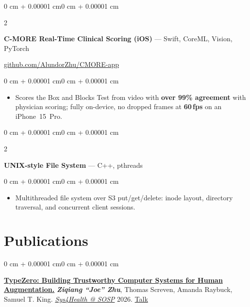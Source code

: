 \documentclass[10pt, letterpaper]{article}
\newenvironment{highlights}{
    \begin{itemize}[
        topsep=0.06 cm,
        parsep=0.04 cm,
        partopsep=0pt,
        itemsep=0pt,
        leftmargin=0 cm + 10pt
    ]
}{
    \end{itemize}
}
\newenvironment{onecolentry}{
    \begin{adjustwidth}{0 cm + 0.00001 cm}{0 cm + 0.00001 cm}
}{
    \end{adjustwidth}
}
\newenvironment{twocolentry}[2][]{
    \onecolentry
    \def\secondColumn{#2}
    \setcolumnwidth{\fill, 6 cm}
    \begin{paracol}{2}
}{
    \switchcolumn \raggedleft \secondColumn
    \end{paracol}
    \endonecolentry
}
\newcommand{\entrygap}{\vspace{0.11 cm}}
\begin{document}
        \entrygap

        \begin{twocolentry}{
            \href{https://github.com/AlundorZhu/CMORE-app}{github.com/AlundorZhu/CMORE-app}
        }
            \textbf{C-MORE Real-Time Clinical Scoring (iOS)} --- Swift, CoreML, Vision, PyTorch
        \end{twocolentry}

        \vspace{0.10 cm}
        \begin{onecolentry}
            \begin{highlights}
                \item Scores the Box and Blocks Test from video with \textbf{over 99\% agreement} with
                      physician scoring; fully on-device, no dropped frames at \textbf{60\,fps} on an
                      iPhone~15~Pro.
            \end{highlights}
        \end{onecolentry}

        \entrygap

        \begin{twocolentry}{
            2023
        }
            \textbf{UNIX-style File System} --- C++, pthreads
        \end{twocolentry}

        \vspace{0.10 cm}
        \begin{onecolentry}
            \begin{highlights}
                \item Multithreaded file system over S3 put/get/delete: inode layout, directory
                      traversal, and concurrent client sessions.
            \end{highlights}
        \end{onecolentry}

    \section{Publications}

        \begin{onecolentry}
            \textbf{\href{https://alundorzhu.github.io/typezero.pdf}{TypeZero: Building Trustworthy Computer Systems for Human
            Augmentation.}} \textbf{\textit{Ziqiang ``Joe'' Zhu}}, Thomas Screven, Amanda Raybuck, Samuel T. King.
            \href{https://konstantina-koliogeorgi.github.io/sys4health-sosp26/}{\textit{Sys4Health @ SOSP}} 2026.
            \href{https://www.youtube.com/watch?v=rzzepjCeo5s\&t=7835s}{Talk}
            \label{pub:typezero}
        \end{onecolentry}
\end{document}
